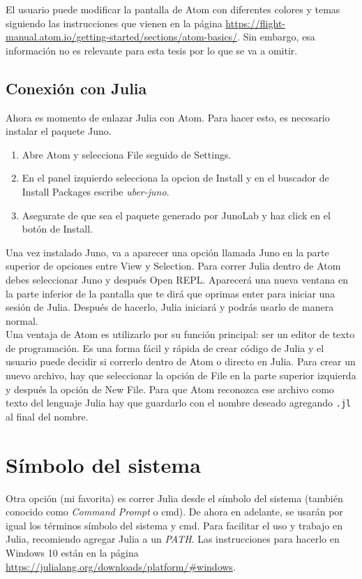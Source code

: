 El usuario puede modificar la pantalla de Atom con diferentes colores y temas siguiendo las instrucciones que vienen en la página \url{https://flight-manual.atom.io/getting-started/sections/atom-basics/}. Sin embargo, esa información no es relevante para esta tesis por lo que se va a omitir. 


\subsection{Conexión con Julia}
Ahora es momento de enlazar Julia con Atom. Para hacer esto, es necesario instalar el paquete Juno. 

\begin{enumerate}
    \item Abre Atom y selecciona \textsf{File} seguido de \textsf{Settings}. 
    \item En el panel izquierdo selecciona la opcion de \textsf{Install} y en el buscador de \textsf{Install Packages} escribe \textit{uber-juno}.
    \item Asegurate de que sea el paquete generado por JunoLab y haz click en el botón de \textsf{Install}. 
\end{enumerate}

Una vez instalado Juno, va a aparecer una opción llamada \textsf{Juno} en la parte superior de opciones entre \textsf{View} y \textsf{Selection}. Para correr Julia dentro de Atom debes seleccionar \textsf{Juno} y después \textsf{Open REPL}. Aparecerá una nueva ventana en la parte inferior de la pantalla que te dirá que oprimas enter para iniciar una sesión de Julia. Después de hacerlo, Julia iniciará y podrás usarlo de manera normal. 
\\
Una ventaja de Atom es utilizarlo por su función principal: ser un editor de texto de programación. Es una forma fácil y rápida de crear código de Julia y el usuario puede decidir si correrlo dentro de Atom o directo en Julia. Para crear un nuevo archivo, hay que seleccionar la opción de \textsf{File} en la parte superior izquierda y después la opción de \textsf{New File}. Para que Atom reconozca ese archivo como texto del lenguaje Julia hay que guardarlo con el nombre deseado agregando \texttt{.jl} al final del nombre. 



\section{Símbolo del sistema}
Otra opción (mi favorita) es correr Julia desde el símbolo del sistema (también conocido como \textit{Command Prompt} o cmd). De ahora en adelante, se usarán por igual los términos símbolo del sistema y cmd. Para facilitar el uso y trabajo en Julia, recomiendo agregar Julia a un \textit{PATH}. Las instrucciones para hacerlo en Windows 10 están en la página \url{https://julialang.org/downloads/platform/#windows}.

